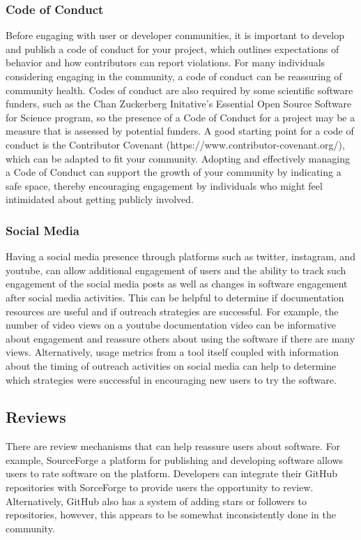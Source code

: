 \documentclass{article}
\begin{document}
\subsubsection{Code of Conduct}
Before engaging with user or developer communities, it is important to develop and publish a code of conduct for your project, which outlines expectations of behavior and how contributors can report violations. For many individuals considering engaging in the community, a code of conduct can be reassuring of community health. Codes of conduct are also required by some scientific software funders, such as the Chan Zuckerberg Initative’s Essential Open Source Software for Science program, so the presence of a Code of Conduct for a project may be a measure that is assessed by potential funders. A good starting point for a code of conduct is the Contributor Covenant (https://www.contributor-covenant.org/), which can be adapted to fit your community. Adopting and effectively managing\cite{aurora_how_2019} a  Code of Conduct can support the growth of your community by indicating a safe space, thereby encouraging engagement by individuals who might feel intimidated about getting publicly involved.

\subsubsection{Social Media}
Having a social media presence through platforms such as twitter, instagram, and youtube, can allow additional engagement of users and the ability to track such engagement of the social media posts as well as changes in software engagement after social media activities. This can be helpful to determine if documentation resources are useful and if outreach strategies are successful. For example, the number of video views on a youtube documentation video can be informative about engagement and reassure others about using the software if there are many views. Alternatively, usage metrics from a tool itself coupled with information about the timing of outreach activities on social media can help to determine which strategies were successful in encouraging new users to try the software.

\subsection{Reviews}
There are review mechanisms that can help reassure users about software. For example, SourceForge\cite{sourceforge} a platform for publishing and developing software allows users to rate software on the platform. Developers can integrate their GitHub repositories with SorceForge to provide users the opportunity to review. Alternatively, GitHub also has a system of adding stars or followers to repositories, however, this appears to be somewhat inconsistently done in the community. 
\end{document}
